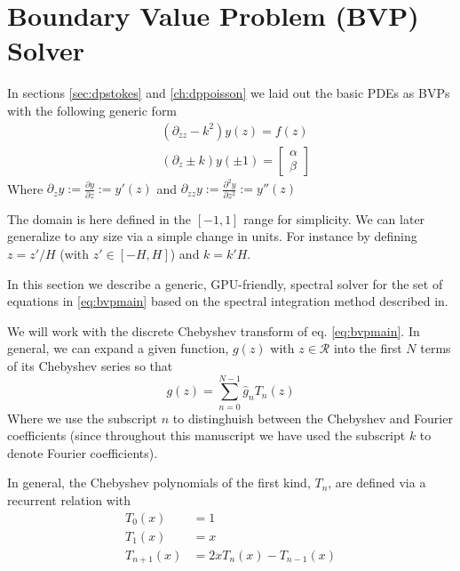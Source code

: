 \documentclass[ twoside,openright,titlepage,numbers=noenddot,%
headinclude,footinclude,cleardoublepage=empty,abstract=on,
BCOR=5mm,paper=a4,fontsize=11pt, dvipsnames
]{scrreprt}
\newcommand{\gpu}{\gls{GPU}\xspace}
\newcommand{\fou}[1]{\widehat{#1}}
\begin{document}
\chapter{Boundary Value Problem (BVP) Solver} \label{sec:bvp}
In sections \ref{sec:dpstokes} and \ref{ch:dppoisson} we laid out the basic \glspl{PDE} as \glspl{BVP} with the following generic form
\begin{equation}
  \label{eq:bvpmain}
  \begin{aligned}
    &(\partial_{zz}-k^2)y(z)=f(z)\\
    &(\partial_{z}\pm k)y(\pm 1)=
    \begin{bmatrix}
      \alpha\\
      \beta
    \end{bmatrix}
\end{aligned}
\end{equation}
Where $\partial_z y:= \frac{\partial y}{\partial z} := y'(z)$ and $\partial_{zz} y:= \frac{\partial^2 y}{\partial z^2} := y''(z)$

The domain is here defined in the $[-1, 1]$ range for simplicity. We can later generalize to any size via a simple change in units. For instance by defining $z = z'/H$ (with $z'\in [-H, H]$) and $k = k'H$.

In this section we describe a generic, \gpu-friendly, spectral solver for the set of equations in \eqref{eq:bvpmain} based on the spectral integration method described in\cite{Greengard1991}.

We will work with the discrete Chebyshev transform of eq. \eqref{eq:bvpmain}. In general, we can expand a given function, $g(z)$ with $z\in \mathcal{R}$ into the first $N$ terms of its Chebyshev series so that
\begin{equation}
\label{eq:bvpchebexp}
g(z) = \sum_{n=0}^{N-1} \fou{g}_n T_n(z)
\end{equation}
Where we use the subscript $n$ to distinghuish between the Chebyshev and Fourier coefficients (since throughout this manuscript we have used the subscript $k$ to denote Fourier coefficients).

In general, the Chebyshev polynomials of the first kind, $T_n$, are defined via a recurrent relation with
\begin{equation}
  \label{eq:bvpchebpoly}
  \begin{aligned}
    T_0(x) &= 1\\
    T_1(x) &= x\\
    T_{n+1}(x) &= 2xT_n(x) - T_{n-1}(x)
  \end{aligned}
\end{equation}
\end{document}
